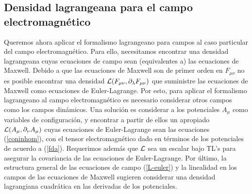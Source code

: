\subsection{Densidad lagrangeana para el campo electromagnético}
Queremos ahora aplicar el formalismo lagrangeano para campos al caso particular
del campo electromagnético. Para ello, necesitamos encontrar una densidad
lagrangeana cuyas ecuaciones de campo sean (equivalentes a) las ecuaciones de
Maxwell. Debido a que las ecuaciones de Maxwell son de primer orden en
$F_{\mu\nu}$ no es posible encontrar una densidad ${\cal
L}(F_{\mu\nu},\partial_\lambda F_{\mu\nu})$ que suministre las ecuaciones de
Maxwell como ecuaciones de Euler-Lagrange. Por esto, para aplicar el formalismo
lagrangeano al campo electromagnético es necesario considerar otros campos como
los campos dinámicos. Una solución es considerar a los potenciales $A_\mu$
como variables de configuración, y encontrar a partir de ellos un apropiado
${\cal L}(A_\mu,\partial_\nu A_\mu)$ cuyas ecuaciones de Euler-Lagrange sean las
ecuaciones (\ref{coninhom}), con el tensor electromagnético dado en
términos de los potenciales de acuerdo a (\ref{fda}). Requerimos
además que $\cal L$ sea un escalar bajo TL's para asegurar la
covariancia de las ecuaciones de Euler-Lagrange. Por último, la estructura
general de las ecuaciones de campo (\ref{L-euler}) y la linealidad en los campos
de las ecuaciones de Maxwell sugieren considerar una densidad lagrangiana
cuadrática en las derivadas de los potenciales.

